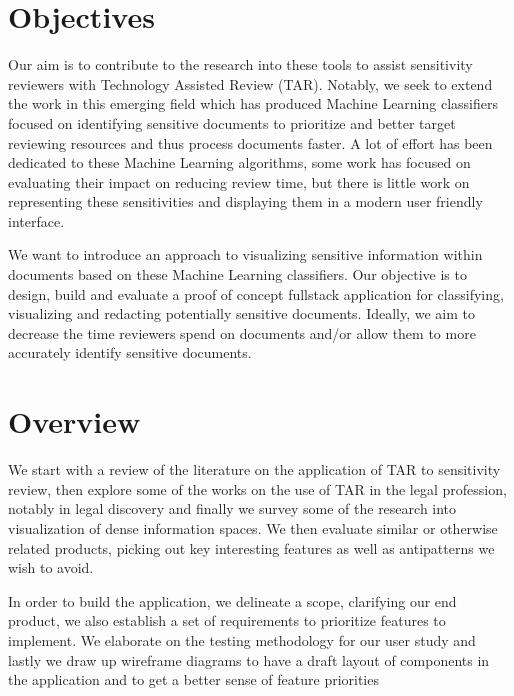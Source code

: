 \documentclass[\version]{l4proj}
\begin{document}
\section{Objectives}

Our aim is to contribute to the research into these tools to assist sensitivity reviewers with Technology Assisted Review (TAR).
Notably, we seek to extend the work in this emerging field which has produced Machine Learning classifiers focused on identifying sensitive documents to prioritize and better target reviewing resources and thus process documents faster.
A lot of effort has been dedicated to these Machine Learning algorithms, some work has focused on evaluating their impact on reducing review time, but there is little work on representing these sensitivities and displaying them in a modern user friendly interface.

We want to introduce an approach to visualizing sensitive information within documents based on these Machine Learning classifiers.
Our objective is to design, build and evaluate a proof of concept fullstack application for classifying, visualizing and redacting potentially sensitive documents.
Ideally, we aim to decrease the time reviewers spend on documents and/or allow them to more accurately identify sensitive documents.

\section{Overview}

We start with a review of the literature on the application of TAR to sensitivity review, then explore some of the works on the use of TAR in the legal profession, notably in legal discovery and finally we survey some of the research into visualization of dense information spaces.
We then evaluate similar or otherwise related products, picking out key interesting features as well as antipatterns we wish to avoid.

In order to build the application, we delineate a scope, clarifying our end product, we also establish a set of requirements to prioritize features to implement.
We elaborate on the testing methodology for our user study and lastly we draw up wireframe diagrams to have a draft layout of components in the application and to get a better sense of feature priorities
\end{document}
